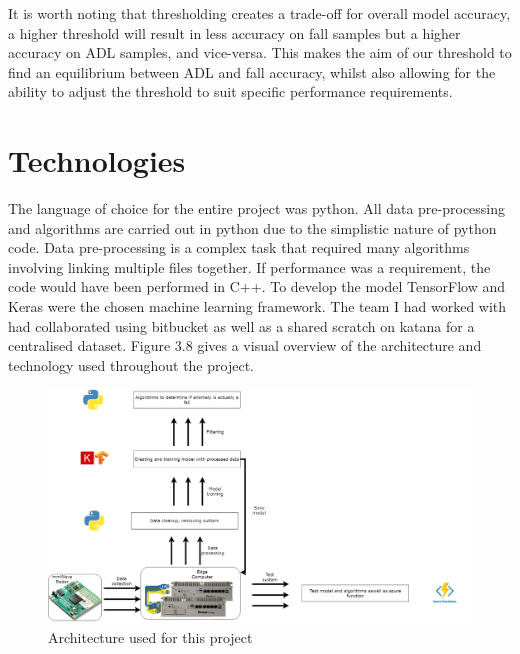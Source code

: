 It is worth noting that thresholding creates a trade-off for overall model accuracy, a higher threshold will result in less accuracy on fall samples but a higher accuracy on ADL samples, and vice-versa. This makes the aim of our threshold to find an equilibrium between ADL and fall accuracy, whilst also allowing for the ability to adjust the threshold to suit specific performance requirements. 


\section{Technologies}
The language of choice for the entire project was python. All data pre-processing and algorithms are carried out in python due to the simplistic nature of python code. Data pre-processing is a complex task that required many algorithms involving linking multiple files together. If performance was a requirement, the code would have been performed in C++. To develop the model TensorFlow and Keras were the chosen machine learning framework. The team I had worked with had collaborated using bitbucket as well as a shared scratch on katana for a centralised dataset. Figure 3.8 gives a visual overview of the architecture and technology used throughout the project.

\begin{figure}[H]
    \centering
    \includegraphics[width=500px, keepaspectratio=true]{archtrain.png}
    \caption{Architecture used for this project}
    \label{fig:my_label}
\end{figure}